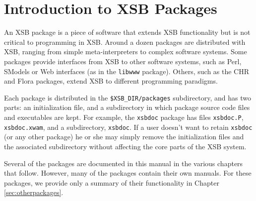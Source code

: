 \chapter{Introduction to XSB Packages} \label{packages}

An XSB package is a piece of software that extends XSB functionality
but is not critical to programming in XSB.  Around a dozen packages
are distributed with XSB, ranging from simple meta-interpreters to
complex software systems.  Some packages provide interfaces from XSB
to other software systems, such as Perl, SModels or Web interfaces (as
in the {\tt libwww} package).  Others, such as the CHR and Flora packages,
extend XSB to different programming paradigms.

Each package is distributed in the {\tt \$XSB\_DIR/packages}
subdirectory, and has two parts: an initialization file, and a
subdirectory in which package source code files and executables are
kept.  For example, the {\tt xsbdoc} package has files {\tt xsbdoc.P},
{\tt xsbdoc.xwam}, and a subdirectory, {\tt xsbdoc}.  If a user
doesn't want to retain {\tt xsbdoc} (or any other package) he or she
may simply remove the initialization files and the associated
subdirectory without affecting the core parts of the XSB system.

Several of the packages are documented in this manual in the various
chapters that follow.  However, many of the packages contain their own
manuals.  For these packages, we provide only a summary of their
functionality in Chapter \ref{sec:otherpackages}.

